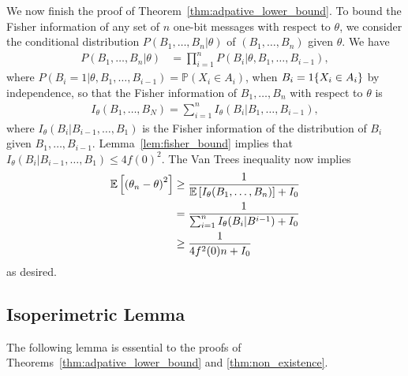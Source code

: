 We now finish the proof of Theorem~\ref{thm:adpative_lower_bound}.
To bound the Fisher information of any set of $n$ one-bit
messages with respect to $\theta$, we consider the conditional distribution $P({B_1,\ldots,B_n|\theta})$ of
$(B_1,\ldots,B_n)$ given $\theta$. We have
\begin{align*}
  P\left( B_1,\ldots,B_n | \theta \right) & =  \prod_{i=1}^n P\left(B_i | \theta, B_1,\ldots,B_{i-1} \right),
\end{align*}
where $P\left(B_i =1 | \theta, B_1,\ldots,B_{i-1} \right) = \mathbb P\left(
X_i \in A_i\right)$, when $B_i = 1\!\left\{X_i \in A_i\right\}$ by independence,
so that the Fisher information of $B_1,\ldots,B_n$ with
respect to $\theta$ is
\begin{align}
I_\theta(B_1,\ldots,B_N) = \sum_{i=1}^n I_\theta (B_i|B_1,\ldots,B_{i-1}),
\label{eq:fisher_information}
\end{align}
where $I_\theta (B_i|B_{i-1},\ldots,B_1)$ is the Fisher information of the
distribution of $B_i$ given $B_1,\ldots,B_{i-1}$.
Lemma~\ref{lem:fisher_bound} implies that $I_\theta
(B_i|B_{i-1},\ldots,B_1) \leq 4f(0)^2$. The Van Trees inequality
\cite{van2004detection, gill1995applications} now implies
\begin{align*}
\mathbb{E}\left[  \left( \theta_n - \theta \right)^2\right] &  \geq \frac{1}{ \mathbb{E}\left[  I_\theta(B_1,\ldots,B_n)\right] + I_0} \\
& = \frac{1}{ \sum_{i=1}^n I_\theta (B_i | B^{i-1} ) + I_0} \\
& \geq \frac{1}{ 4f^2(0) n + I_0}
\end{align*}
as desired.

\subsection{Isoperimetric Lemma}
\label{sec:bound_intervals_delta}

The following lemma is essential to the proofs
of Theorems~\ref{thm:adpative_lower_bound} and
\ref{thm:non_existence}.

